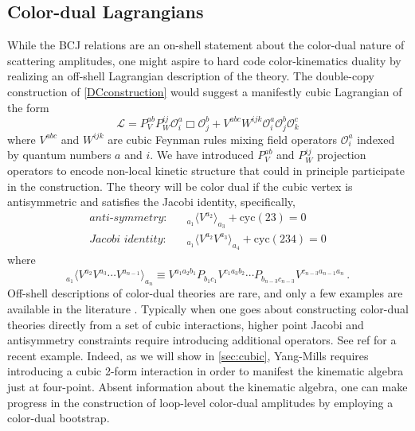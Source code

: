 \documentclass[11pt,letter]{article}
\begin{document}
\subsection{Color-dual Lagrangians}\label{offShellCK}
While the BCJ relations are an on-shell statement about the color-dual
nature of scattering amplitudes, one might aspire to hard code
color-kinematics duality by realizing an off-shell Lagrangian
description of the theory. The double-copy construction of
\cref{DCconstruction} would suggest a manifestly cubic Lagrangian of
the form
\begin{equation}
\mathcal{L} = P_V^{ab}P_W^{ij}\mathcal{O}^a_i \Box \mathcal{O}^b_j +  V^{abc} W^{ijk}\mathcal{O}^a_i \mathcal{O}^b_j \mathcal{O}^c_k
\end{equation}
where $V^{abc}$ and $W^{ijk}$ are cubic Feynman rules mixing field
operators $\mathcal{O}^{a}_i$ indexed by quantum numbers $a$ and
$i$. We have introduced $P_V^{ab}$ and $P_W^{ij}$ projection operators
to encode non-local kinetic structure that could in principle
participate in the construction.
The theory will be color dual if the cubic vertex is antisymmetric and satisfies the Jacobi identity, specifically,
\begin{align}
\textit{anti-symmetry}:& \quad{}_{a_1}\langle V^{a_2} \rangle_{a_3}+\text{cyc}(23)=0
\\
\textit{Jacobi identity}:& \quad {}_{a_1}\langle V^{a_2} V^{a_3}\rangle_{a_4}+\text{cyc}(234)=0
\end{align}
where 
\begin{equation}
{}_{a_1}\langle V^{a_2}V^{a_3}\cdots V^{a_{n-1}} \rangle_{a_n} \equiv V^{a_1a_2b_1}P_{b_1 c_1}V^{c_1 a_3b_2}\cdots P_{b_{n-3}c_{n-3}}V^{c_{n-3} a_{n-1}a_n}\,.
\end{equation}
Off-shell descriptions of
color-dual theories are rare, and only a few examples are available in
the literature \cite{Monteiro2011pc, Cheung:2016prv, Cheung:2021zvb,
  Cheung:2020djz, Ben-Shahar:2022ixa, Ben-Shahar:2021zww,
  Ben-Shahar:2021doh}.
Typically when one goes about constructing color-dual
theories directly from a set of cubic interactions, higher point
Jacobi and antisymmetry constraints require introducing additional
operators. See ref \cite{Ben-Shahar:2022ixa} for a recent
example. Indeed, as we will show in \cref{sec:cubic}, Yang-Mills
requires introducing a cubic 2-form interaction in order to manifest
the kinematic algebra just at four-point. Absent information about the
kinematic algebra, one can make progress in the construction of
loop-level color-dual amplitudes by employing a color-dual bootstrap.
\end{document}
